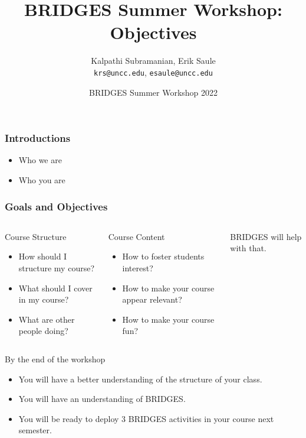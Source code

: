 \documentclass[aspectratio=169]{beamer}
\title[Objectives]{BRIDGES Summer Workshop:\\Objectives}
\subtitle{}
\author{Kalpathi Subramanian, Erik Saule\\\texttt{krs@uncc.edu}, \texttt{esaule@uncc.edu}}
\institute{The University of North Carolina at Charlotte}
\date{BRIDGES Summer Workshop 2022}
\begin{document}
\begin{frame}
\titlepage

\end{frame}


\begin{frame}
  \frametitle{Introductions}

  \begin{itemize}
  \item Who we are
  \item Who you are
  \end{itemize}
\end{frame}

\begin{frame}
  \frametitle{Goals and Objectives}

  \begin{columns}
    \begin{block}{Course Structure}
      \begin{itemize}
      \item How should I structure my course?
      \item What should I cover in my course?
      \item What are other people doing?
      \end{itemize}
    \end{block}

    \begin{block}{Course Content}
      \begin{itemize}
      \item How to foster students interest?
      \item How to make your course appear relevant?
      \item How to make your course fun?
      \end{itemize}
    \end{block}

   BRIDGES will help with that.
  \end{columns}

  \begin{block}{By the end of the workshop}
    \begin{itemize}
    \item You will have a better understanding of the structure of your class.
    \item You will have an understanding of BRIDGES.
    \item You will be ready to deploy 3 BRIDGES activities in your course next semester.
    \end{itemize}
  \end{block}
\end{frame}
\end{document}
